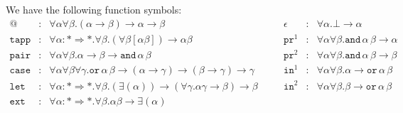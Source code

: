 \documentclass[a4paper,UKenglish,cleveref,autoref,numberwithinsect]{lipics-v2019}
\theoremstyle{definition}
\newcommand{\arrkind}{\Rightarrow}
\newcommand{\arrtype}{\rightarrow}
\newcommand{\proj}{\mathtt{pr}}
\begin{document}
We have the following function symbols:
\[
\begin{array}{rclcrcl}
@ & : & \forall \alpha \forall \beta . (\alpha \arrtype \beta) \arrtype \alpha \arrtype \beta &
\quad &
\epsilon & : & \forall \alpha . \bot \arrtype \alpha \\

\mathtt{tapp} & : & \forall \alpha : * \arrkind * . \forall \beta .
  (\forall \beta [\alpha \beta]) \arrtype \alpha \beta &
\quad &
\proj^1 & : & \forall \alpha \forall \beta . \mathtt{and}\, \alpha\, \beta \arrtype \alpha \\

\mathtt{pair} & : & \forall \alpha \forall \beta . \alpha \arrtype \beta \arrtype
  \mathtt{and}\, \alpha\, \beta &
\quad &
\proj^2 & : & \forall \alpha \forall \beta . \mathtt{and}\, \alpha\, \beta \arrtype \beta \\

\mathtt{case} & : & \forall \alpha \forall \beta \forall \gamma . \mathtt{or}\, \alpha\, \beta \arrtype
  (\alpha \arrtype \gamma) \arrtype (\beta \arrtype \gamma) \arrtype \gamma &
\quad &
\mathtt{in}^1 & : & \forall \alpha \forall \beta . \alpha \arrtype
  \mathtt{or}\, \alpha\, \beta \\

\mathtt{let} & : & \forall \alpha : * \arrkind * . \forall \beta .
  (\exists (\alpha)) \arrtype
  (\forall \gamma . \alpha \gamma \arrtype \beta) \arrtype \beta &
\quad &
\mathtt{in}^2 & : & \forall \alpha \forall \beta . \beta \arrtype
  \mathtt{or}\, \alpha\, \beta \\

\mathtt{ext} & : & \forall \alpha : * \arrkind * . \forall \beta . \alpha \beta \arrtype
  \exists (\alpha)
\end{array}
\]
\end{document}
